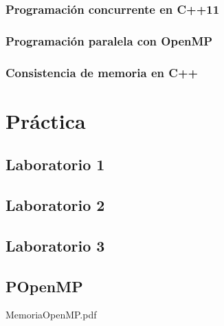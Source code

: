 \documentclass[12pt, twoside, openright]{report} %
\begin{document}
  

\section{Programación concurrente en C++11}

  

\section{Programación paralela con OpenMP}

  

\section{Consistencia de memoria en C++}

  


\part{Práctica}

\chapter{Laboratorio 1}



  \chapter{Laboratorio 2}


  

  
  \chapter{Laboratorio 3}


  

  
  \chapter{POpenMP}
  

  {MemoriaOpenMP.pdf}

  
\end{document}
